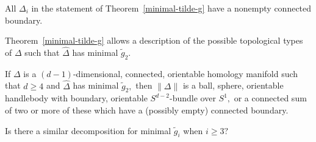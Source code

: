 \documentclass[ALCO,ThmDefs,Unicode,epreuves]{cedram}
\newcommand{\complet}[1]{\hat{#1}}
\begin{document}
 \begin{rema} All $\Delta_i$ in the statement of Theorem~\ref{minimal-tilde-g} have a nonempty connected boundary.
 \end{rema}
 \noindent Theorem~\ref{minimal-tilde-g} allows a description of the possible topological types of $\Delta$ such that $\complet{\Delta}$ has minimal $\tilde{g}_2.$ 
 \begin{coro}
 If $\Delta$ is a $(d-1)$-dimensional, connected, orientable homology manifold such that $d \ge 4$ and $\complet{\Delta}$ has minimal $\tilde{g}_2,$ then $\|\Delta\|$ is a ball, sphere, orientable handlebody with boundary, orientable $S^{d-2}$-bundle over $S^1,$ or a connected sum of two or more of these which have a (possibly empty) connected boundary.
 \end{coro}
 
 
\begin{ques}
Is there a similar decomposition for minimal $\tilde{g}_i$ when $i \ge 3?$
\end{ques}

%





		
\end{document}
